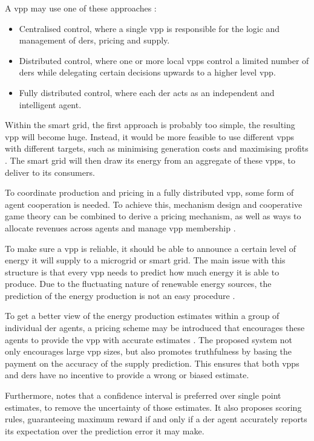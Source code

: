 A \ac{vpp} may use one of these approaches \cite{NikonowiczMilewski2012}:
\begin{itemize}
	\item Centralised control, where a single \ac{vpp} is responsible for the logic and management of \acp{der}, pricing and supply.
	\item Distributed control, where one or more local \acp{vpp} control a limited number of \acp{der} while delegating certain decisions upwards to a higher level \ac{vpp}.
	\item Fully distributed control, where each \ac{der} acts as an independent and intelligent agent.
\end{itemize}

Within the smart grid, the first approach is probably too simple, the resulting \ac{vpp} will become huge. Instead, it would be more feasible to use different \acp{vpp} with different targets, such as minimising generation costs and maximising profits \cite{LombardiPowalkoRudion2009}. The smart grid will then draw its energy from an aggregate of these \acp{vpp}, to deliver to its consumers. 

To coordinate production and pricing in a fully distributed \ac{vpp}, some form of agent cooperation is needed. To achieve this, mechanism design and cooperative game theory can be combined to derive a pricing mechanism, as well as ways to allocate revenues across agents and manage \ac{vpp} membership \cite{ChalkiadakisRobuKotaEtAl2011}. 

To make sure a \ac{vpp} is reliable, it should be able to announce a certain level of energy it will supply to a microgrid or smart grid. The main issue with this structure is that every \ac{vpp} needs to predict how much energy it is able to produce. Due to the fluctuating nature of renewable energy sources, the prediction of the energy production is not an easy procedure \cite{LombardiPowalkoRudion2009}.  

To get a better view of the energy production estimates within a group of individual \ac{der} agents, a pricing scheme may be introduced that encourages these agents to provide the \ac{vpp} with accurate estimates \cite{ChalkiadakisRobuKotaEtAl2011}. The proposed system not only encourages large \ac{vpp} sizes, but also promotes truthfulness by basing the payment on the accuracy of the supply prediction. This ensures that both \acp{vpp} and \acp{der} have no incentive to provide a wrong or biased estimate.

Furthermore, \cite{RobuKotaChalkiadakisEtAl2012} notes that a confidence interval is preferred over single point estimates, to remove the uncertainty of those estimates. It also proposes scoring rules, guaranteeing maximum reward if and only if a \ac{der} agent accurately reports its expectation over the prediction error it may make.  

